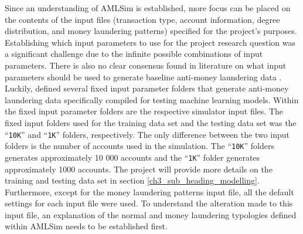Since an understanding of AMLSim is established, more focus can be placed on the contents of the input files (transaction type, account information, degree distribution, and money laundering patterns) specified for the project's purposes. Establishing which input parameters to use for the project research question was a significant challenge due to the infinite possible combinations of input parameters. There is also no clear consensus found in literature on what input parameters should be used to generate baseline anti-money laundering data \citep{pareja2020evolvegcn, AMLSim, weber2018scalable}. Luckily, \citet{AMLSim} defined several fixed input parameter folders that generate anti-money laundering data specifically compiled for testing machine learning models. Within the fixed input parameter folders are the respective simulator input files. The fixed input folders used for the training data set and the testing data set was the ``\texttt{10K}'' and ``\texttt{1K}'' folders, respectively. The only difference between the two input folders is the number of accounts used in the simulation. The ``\texttt{10K}'' folders generates approximately 10 000 accounts and the ``\texttt{1K}'' folder generates approximately 1000 accounts. The project will provide more details on the training and testing data set in section \ref{ch3_sub_heading_modelling}. Furthermore, except for the money laundering patterns input file, all the default settings for each input file were used. To understand the alteration made to this input file, an explanation of the normal and money laundering typologies defined within AMLSim needs to be established first.

